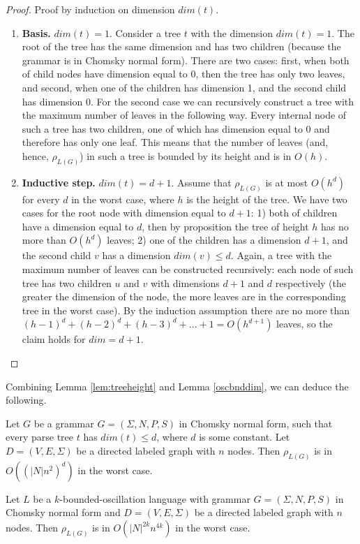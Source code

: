 \begin{proof}
Proof by induction on dimension $dim(t)$.
\begin{enumerate} 
\item \textbf{Basis.} $dim(t) = 1$. Consider a tree $t$ with the dimension $dim(t) = 1$. The root of the tree has the same dimension and has two children (because the grammar is in Chomsky normal form). There are two cases:  first, when both of child nodes have dimension equal to 0, then the tree has only two leaves, and second, when one of the children has dimension 1, and the second child has dimension 0. For the second case we can recursively construct a tree with the maximum number of leaves in the following way. Every internal node of such a tree has two children, one of which has dimension equal to 0 and therefore has only one leaf. This means that the number of leaves (and, hence, $\rho_{L(G)}$) in such a tree is bounded by its height and is in $O(h)$. 

\item \textbf{Inductive step.} $dim(t) = d + 1$. Assume that $\rho_{L(G)}$ is at most $O(h^{d})$ for every $d$ in the worst case, where $h$ is the height of the tree. We have two cases for the root node with dimension equal to $d+1$: 1) both of children have a dimension equal to $d$, then by proposition the tree of height $h$ has no more than $O(h^{d})$ leaves; 2) one of the children has a dimension $d + 1$, and the second child $v$ has a dimension $dim(v) \le d$. Again, a tree with the maximum number of leaves can be constructed recursively:  each node of such tree has two children $u$ and $v$ with dimensions $d+1$ and $d$ respectively (the greater the dimension of the node, the more leaves are in the corresponding tree in the worst case). By the induction assumption there are no more than $(h-1)^d + (h-2)^d + (h-3)^d + ... + 1 = O(h^{d+1})$ leaves, so the claim holds for $dim = d+1$.
\end{enumerate}
\end{proof}
Combining Lemma \ref{lem:treeheight} and Lemma \ref{oscbnddim}, we can deduce the following.
\begin{corollary}
\label{finaldim}
Let $G$ be a grammar $G = (\Sigma, N, P, S)$ in Chomsky normal form, such that every parse tree $t$ has $dim(t) \le d$, where $d$ is some constant. Let $D=(V, E, \Sigma)$ be a directed labeled graph with $n$ nodes. Then $\rho_{L(G)}$ is in $O({(|N|n^2)}^d)$ in the worst case.
\end{corollary}
\begin{theorem}
\label{oscbndosc}
Let $L$ be a $k$-bounded-oscillation language with grammar $G = (\Sigma, N, P, S)$ in Chomsky normal form and $D=(V, E, \Sigma)$ be a directed labeled graph with $n$ nodes. Then $\rho_{L(G)}$ is in $O({|N|}^{2k}n^{4k})$ in the worst case.
\end{theorem}
